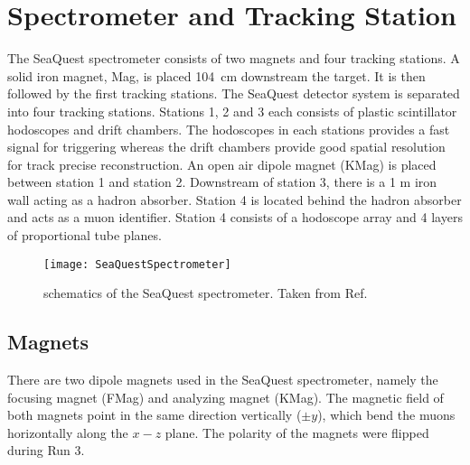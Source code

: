 \documentclass[../main.tex]{subfiles}
\begin{document}
\section{Spectrometer and Tracking Station}
The SeaQuest spectrometer consists of two magnets and four tracking stations. A solid iron magnet,
Mag, is placed \SI{104}{\cm} downstream the target. It is then followed by
the first tracking stations. The SeaQuest detector system is separated into four tracking stations.
Stations 1, 2 and 3 each consists of plastic scintillator hodoscopes and drift chambers.
The hodoscopes in each stations provides a fast signal for triggering whereas
the drift chambers provide good spatial resolution for track precise reconstruction.
An open air dipole magnet (KMag) is placed between station 1 and station 2.
Downstream of station 3, there is a 1 m iron wall acting as a
hadron absorber. Station 4 is located behind the hadron absorber and acts as a
muon identifier. Station 4 consists of a hodoscope array and 4 layers of
proportional tube planes.

\begin{figure}[htbp!]
	\centering
	\texttt{[image: SeaQuestSpectrometer]}
	\caption{schematics of the SeaQuest spectrometer. Taken from Ref.~\cite{aidala2019}}
	\label{fig:spectrometer}
\end{figure}

\subsection{Magnets}
There are two dipole magnets used in the SeaQuest spectrometer, namely the focusing
magnet (FMag) and analyzing magnet (KMag). The magnetic field of both magnets point
in the same direction vertically ($\pm y$), which bend the muons horizontally along
the $x-z$ plane. The polarity of the magnets were flipped during Run 3.
\end{document}
